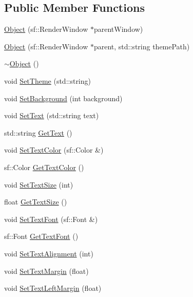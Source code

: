 \subsection*{Public Member Functions}
\begin{CompactItemize}
\item 
\hyperlink{classsfgui_1_1Object_f03d0a10a3f8f71c58f56cf896e95f82}{Object} (sf::RenderWindow $\ast$parentWindow)
\item 
\hyperlink{classsfgui_1_1Object_6d0f96eda1f89ba15d34471cfa42a0e4}{Object} (sf::RenderWindow $\ast$parent, std::string themePath)
\item 
\hyperlink{classsfgui_1_1Object_7d923592a63a854c77ce4edcb21e40ba}{$\sim$Object} ()
\item 
void \hyperlink{classsfgui_1_1Object_96e00c4db6358d27ad806c0053e343a1}{SetTheme} (std::string)
\item 
void \hyperlink{classsfgui_1_1Object_b3477443fde0d86be5e32f5c1dcd7b01}{SetBackground} (int background)
\item 
void \hyperlink{classsfgui_1_1Object_64c05d85588778a652d11c7a1daf8db0}{SetText} (std::string text)
\item 
std::string \hyperlink{classsfgui_1_1Object_070ede7cda0e7b3cab312aac5013a206}{GetText} ()
\item 
void \hyperlink{classsfgui_1_1Object_88f1c97f50dd466417309f0776dce452}{SetTextColor} (sf::Color \&)
\item 
sf::Color \hyperlink{classsfgui_1_1Object_df734af2a7ca4ad600fe8bff51ed06cc}{GetTextColor} ()
\item 
void \hyperlink{classsfgui_1_1Object_6aba72276a557c90fef974478e88a04d}{SetTextSize} (int)
\item 
float \hyperlink{classsfgui_1_1Object_a6fae4cfa68982563c49b8b13b11966b}{GetTextSize} ()
\item 
void \hyperlink{classsfgui_1_1Object_41801231361e4866d99ce7d4ef32e53d}{SetTextFont} (sf::Font \&)
\item 
sf::Font \hyperlink{classsfgui_1_1Object_5f1d579d8ebba512fb983622552fe40f}{GetTextFont} ()
\item 
void \hyperlink{classsfgui_1_1Object_191bba44abbc751fd80e6f19ad6aba5b}{SetTextAlignment} (int)
\item 
void \hyperlink{classsfgui_1_1Object_f71c39eb2dfd2eb76e9be9e5dad606d9}{SetTextMargin} (float)
\item 
void \hyperlink{classsfgui_1_1Object_28408aa0cf50c8da37a79215755c01d9}{SetTextLeftMargin} (float)
\item 

\end{CompactItemize}

